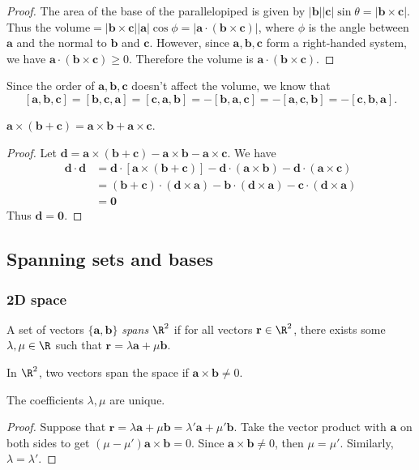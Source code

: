 \documentclass[a4paper]{article}
\begin{document}
\begin{proof}
  The area of the base of the parallelopiped is given by $\mathbf{|b||c|}\sin\theta = \mathbf{|b\times c|}$. Thus the volume$ = \mathbf{|b\times c||a|}\cos\phi = \mathbf{|a\cdot(b\times c)|}$, where $\phi$ is the angle between $\mathbf{a}$ and the normal to $\mathbf{b}$ and $\mathbf{c}$. However, since $\mathbf{a, b, c}$ form a right-handed system, we have $\mathbf{a\cdot (b\times c)} \geq 0$. Therefore the volume is $\mathbf{a\cdot(b\times c)}$.
\end{proof}
Since the order of $\mathbf{a, b, c}$ doesn't affect the volume, we know that
\[
  \mathbf{[a, b, c] = [b, c, a] = [c, a, b] = -[b, a, c] = -[a, c, b] = -[c, b, a]}.
\]

\begin{thm}
  $\mathbf{a\times (b + c) = a\times b + a\times c}$.
\end{thm}
\begin{proof}
  Let $\mathbf{d = a\times (b + c) - a\times b - a\times c}$. We have
  \begin{align*}
    \mathbf{d\cdot d} &= \mathbf{d\cdot[a\times (b + c)] - d\cdot(a\times b) - d\cdot(a\times c)}\\
    &= \mathbf{(b+c)\cdot(d \times a) - b\cdot(d\times a) - c\cdot(d\times a)}\\
    &= \mathbf{0}
  \end{align*}
  Thus $\mathbf{d = 0}$.
\end{proof}

\subsection{Spanning sets and bases}
\subsubsection{2D space}
\begin{defi}
  A set of vectors $\{\mathbf{a, b}\}$ \emph{spans} $\R^2$ if for all vectors $\mathbf{r}\in \R^2$, there exists some $\lambda, \mu\in \R$ such that $\mathbf{r} = \lambda\mathbf{a} + \mu\mathbf{b}$.
\end{defi}

In $\R^2$, two vectors span the space if $\mathbf{a}\times \mathbf{b} \not= 0$.
\begin{thm}
  The coefficients $\lambda, \mu$ are unique.
\end{thm}

\begin{proof}
  Suppose that $\mathbf{r} = \lambda\mathbf{a} + \mu\mathbf{b} = \lambda'\mathbf{a} + \mu'\mathbf{b}$. Take the vector product with $\mathbf{a}$ on both sides to get $(\mu - \mu')\mathbf{a\times b} = 0$. Since $\mathbf{a\times b}\not= 0$, then $\mu=\mu'$. Similarly, $\lambda = \lambda'$.
\end{proof}
\end{document}
